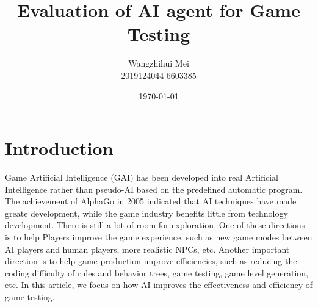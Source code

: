 \documentclass[11pt,en,number]{elegantpaper}
\title{ Evaluation of AI agent for Game Testing}
\author{Wangzhihui Mei \\ 2019124044 6603385}
\institute{UOW-CCNU JI}
\date{\today}
\begin{document}
\maketitle

 


\section{Introduction}
\noindent
Game Artificial Intelligence (GAI) has been developed into real Artificial Intelligence rather than pseudo-AI based on the predefined automatic program. The achievement of AlphaGo in 2005 indicated that AI techniques have made greate development, while the game industry benefits little from technology development. There is still a lot of room for exploration. One of these directions is to help Players improve the game experience, such as new game modes between AI players and human players, more realistic NPCs, etc. Another important direction is to help game production improve efficiencies, such as reducing the coding difficulty of rules and behavior trees, game testing, game level generation, etc. In this article, we focus on how AI improves the effectiveness and efficiency of game testing. 
\end{document}
